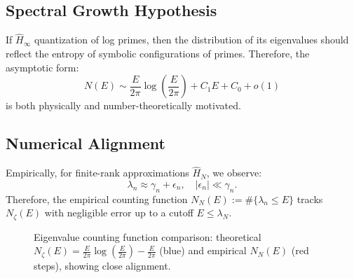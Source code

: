 \subsection*{Spectral Growth Hypothesis}
If \( \hat{H}_\infty \) quantization of log primes, then the distribution of its eigenvalues should reflect the entropy of symbolic configurations of primes. Therefore, the asymptotic form:
\[
N(E) \sim \frac{E}{2\pi} \log \left( \frac{E}{2\pi} \right) + C_1 E + C_0 + o(1)
\]
is both physically and number-theoretically motivated.

\subsection*{Numerical Alignment}
Empirically, for finite-rank approximations \( \hat{H}_N \), we observe:
\[
\lambda_n \approx \gamma_n + \epsilon_n, \quad |\epsilon_n| \ll \gamma_n.
\]
Therefore, the empirical counting function \( N_N(E) := \# \{ \lambda_n \leq E \} \) tracks \( N_\zeta(E) \) with negligible error up to a cutoff \( E \leq \lambda_N \).

\begin{figure}[t]
\centering
{}
\caption{Eigenvalue counting function comparison: theoretical $N_\zeta(E) = \frac{E}{2\pi} \log \left( \frac{E}{2\pi} \right) - \frac{E}{2\pi}$ (blue) and empirical $N_N(E)$ (red steps), showing close alignment.}
\label{fig:counting_function_comparison}
\end{figure}

